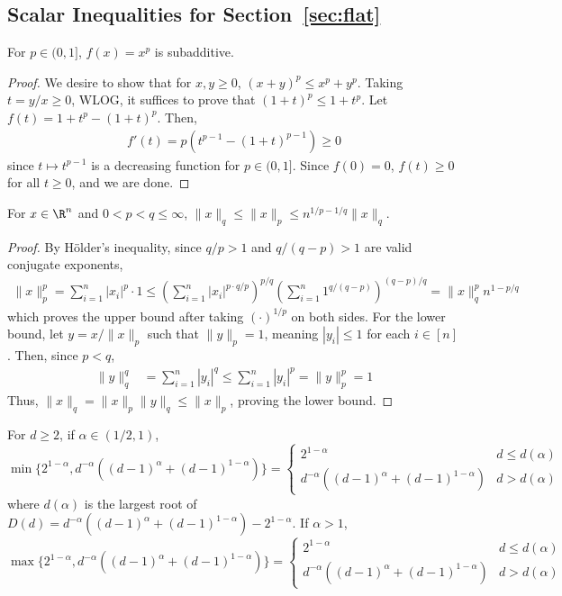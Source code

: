 \documentclass[11pt]{article}
\begin{document}
\subsection{Scalar Inequalities for Section~\ref{sec:flat}}\label{x:flat}
\begin{fact}\label{fact:xp-subadd}
    For $p\in (0,1]$, $f(x)=x^p$ is subadditive. 
\end{fact}
\begin{proof}
    We desire to show that for $x,y\geq 0$, $(x+y)^p\leq x^p+y^p$. Taking $t=y/x\geq 0$, WLOG, it suffices to prove that $(1+t)^p\leq 1+t^p$. Let $f(t)=1+t^p-(1+t)^p$. Then,
    \begin{align*}
       f'(t)=p(t^{p-1} -(1+t)^{p-1})\geq 0
    \end{align*}
    since $t\mapsto t^{p-1}$ is a decreasing function for $p\in (0,1]$. Since $f(0)=0$, $f(t)\geq 0$ for all $t\geq 0$, and we are done.
\end{proof}
\begin{fact}\label{fact:lp-monotonicity}
   For $x \in \R^n $ and $0<p<q\leq \infty$, $\|x\|_q\leq \|x\|_p\leq n^{1/p-1/q}\|x\|_q$. 
\end{fact}
\begin{proof}
    By H\"older's inequality, since $q/p>1$ and $q/(q-p)>1$ are valid conjugate exponents,
    \begin{align*}
        \|x\|_p^p=\sum_{i=1}^{n}|x_i|^p\cdot 1\leq \left(\sum_{i=1}^{n}|x_i|^{p\cdot q/p}\right)^{p/q}\left(\sum_{i=1}^{n}1^{q/(q-p)}\right)^{(q-p)/q}=\|x\|_q^{p}n^{1-p/q}
    \end{align*}
    which proves the upper bound after taking $(\cdot)^{1/p}$ on both sides. For the lower bound, let $y=x/\|x\|_p$ such that $\|y\|_p=1$, meaning $|y_i|\leq 1$ for each $i\in [n]$. Then, since $p<q$, 
    \begin{align*}
        \|y\|_q^q&=\sum_{i=1}^{n}|y_i|^q\leq \sum_{i=1}^{n}|y_i|^p=\|y\|_p^p=1
    \end{align*}
    Thus, $\|x\|_q=\|x\|_p\|y\|_q\leq \|x\|_p$, proving the lower bound.
\end{proof}
\begin{fact}
    For $d\geq 2 $, if $\alpha \in (1/2,1)$, 
    $$\min\{2^{1-\alpha},d^{-\alpha}((d-1)^\alpha+(d-1)^{1-\alpha})\}=\begin{cases}
        2^{1-\alpha} & d\leq d(\alpha)\\
        d^{-\alpha}((d-1)^\alpha+(d-1)^{1-\alpha}) & d > d(\alpha)
    \end{cases}$$
    where $d(\alpha)$ is the largest root of $D(d)=d^{-\alpha}((d-1)^\alpha+(d-1)^{1-\alpha})-2^{1-\alpha}$. If $\alpha > 1$, 
    $$\max\{2^{1-\alpha},d^{-\alpha}((d-1)^\alpha+(d-1)^{1-\alpha})\}=\begin{cases}
        2^{1-\alpha} & d\leq d(\alpha)\\
        d^{-\alpha}((d-1)^\alpha+(d-1)^{1-\alpha}) & d > d(\alpha)
    \end{cases}$$
    
\end{fact}
\end{document}
